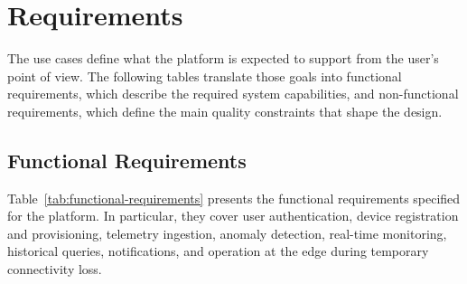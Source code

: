 
\section{Requirements}
\label{sec:RequirementsSpecification}

The use cases define what the platform is expected to support from the user's point of view. The following tables translate those goals into functional requirements, which describe the required system capabilities, and non-functional requirements, which define the main quality constraints that shape the design.

\subsection{Functional Requirements}

Table~\ref{tab:functional-requirements} presents the functional requirements
specified for the platform. In particular, they cover user authentication,
device registration and provisioning, telemetry ingestion, anomaly detection,
real-time monitoring, historical queries, notifications, and operation at the
edge during temporary connectivity loss.

